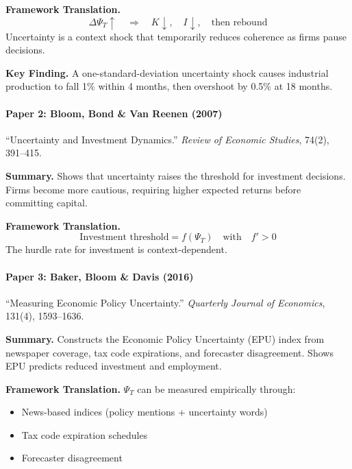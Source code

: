 \textbf{Framework Translation.}
\begin{equation}
  \Delta \Psi_T \uparrow \quad \Rightarrow \quad K \downarrow, \quad I \downarrow, \quad \text{then rebound}
\end{equation}
Uncertainty is a context shock that temporarily reduces coherence as firms pause decisions.

\textbf{Key Finding.}
A one-standard-deviation uncertainty shock causes industrial production to fall 1\%
within 4 months, then overshoot by 0.5\% at 18 months.

\paragraph{Paper 2: Bloom, Bond \& Van Reenen (2007)}

``Uncertainty and Investment Dynamics.''
\textit{Review of Economic Studies}, 74(2), 391--415.

\textbf{Summary.}
Shows that uncertainty raises the threshold for investment decisions. Firms become
more cautious, requiring higher expected returns before committing capital.

\textbf{Framework Translation.}
\begin{equation}
  \text{Investment threshold} = f(\Psi_T) \quad \text{with} \quad f' > 0
\end{equation}
The hurdle rate for investment is context-dependent.

\paragraph{Paper 3: Baker, Bloom \& Davis (2016)}

``Measuring Economic Policy Uncertainty.''
\textit{Quarterly Journal of Economics}, 131(4), 1593--1636.

\textbf{Summary.}
Constructs the Economic Policy Uncertainty (EPU) index from newspaper coverage,
tax code expirations, and forecaster disagreement. Shows EPU predicts reduced
investment and employment.

\textbf{Framework Translation.}
$\Psi_T$ can be measured empirically through:
\begin{itemize}
  \item News-based indices (policy mentions + uncertainty words)
  \item Tax code expiration schedules
  \item Forecaster disagreement
\end{itemize}

